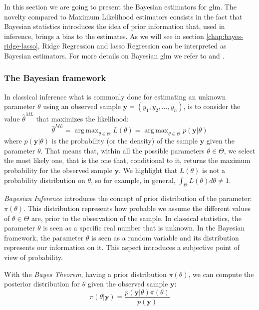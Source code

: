 \documentclass[a4paper, twoside, openright, 12pt]{report}
\DeclareMathOperator*{\argmax}{arg\,max}  %
\theoremstyle{definition}
\theoremstyle{definition}
\theoremstyle{definition}
\theoremstyle{remark}
\begin{document}
In this section we are going to present the Bayesian estimators for \ac{glm}. The novelty compared to Maximum Likelihood estimators consists in the fact that Bayesian statistics introduces the idea of prior information that, used in inference, brings a bias to the estimates. As we will see in section \ref{chap:bayes-ridge-lasso}, Ridge Regression and \ac{lasso} Regression can be interpreted as Bayesian estimators. For more details on Bayesian \ac{glm} we refer to \autocite{wuthrich-data-analytics} and \autocite{gelman2013bayesian}.

\hypertarget{the-bayesian-framework}{%
\subsubsection{The Bayesian framework}\label{the-bayesian-framework}}

In classical inference what is commonly done for estimating an unknown parameter \(\theta\) using an observed sample \(\boldsymbol{y}=(y_1, y_2, \dots, y_n)\), is to consider the value \(\hat{\theta}^{ML}\) that maximizes the likelihood:
\[
\hat{\theta}^{ML} = \argmax_{\theta\in\Theta}{L(\theta)} = \argmax_{\theta\in\Theta}{p(\boldsymbol{y}|\theta)}
\]
where \(p(\boldsymbol{y}|\theta)\) is the probability (or the density) of the sample \(\boldsymbol{y}\) given the parameter \(\theta\). That means that, within all the possible parameters \(\theta\in\Theta\), we select the most likely one, that is the one that, conditional to it, returns the maximum probability for the observed sample \(\boldsymbol{y}\). We highlight that \(L(\theta)\) is not a probability distribution on \(\theta\), so for example, in general, \(\int_{\Theta}{L(\theta)d\theta}\ne1\).

\emph{Bayesian Inference} introduces the concept of prior distribution of the parameter: \(\pi(\theta)\). This distribution represents how probable we assume the different values of \(\theta\in\Theta\) are, prior to the observation of the sample. In classical statistics, the parameter \(\theta\) is seen as a specific real number that is unknown. In the Bayesian framework, the parameter \(\theta\) is seen as a random variable and its distribution represents our information on it. This aspect introduces a subjective point of view of probability.

With the \emph{Bayes Theorem}, having a prior distribution \(\pi(\theta)\), we can compute the posterior distribution for \(\theta\) given the observed sample \(\boldsymbol{y}\):
\[
\pi(\theta|\boldsymbol{y}) = \frac{p(\boldsymbol{y}|\theta)\pi(\theta)}{p(\boldsymbol{y})}
\]
\end{document}
